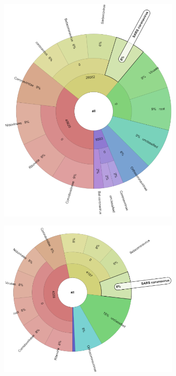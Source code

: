     \begin{figure}[H]
        \centering
        \begin{subfigure}[b]{0.42\textwidth}
        \includegraphics[width=1\textwidth]{figures/results/real/krona/krona-uk-sERR5014633.png}
        \label{fig:results:real:krona-uk-a}
        \end{subfigure}
        \hfill
        \begin{subfigure}[b]{0.52\textwidth}
        \includegraphics[width=1\textwidth]{figures/results/real/krona/krona-uk-sERR5014683.png}

\end{subfigure}
\end{figure}
